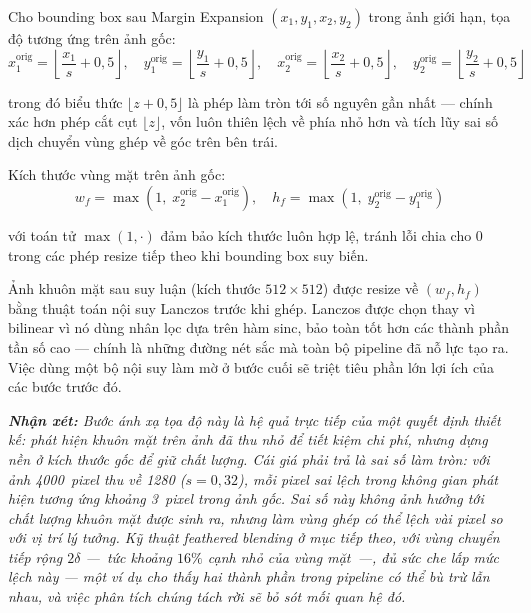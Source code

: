 Cho bounding box sau Margin Expansion $(x_1, y_1, x_2, y_2)$ trong ảnh giới hạn, tọa độ tương ứng trên ảnh gốc:
\begin{equation}
\label{eq:hybrid_map}
x_1^{\text{orig}} = \left\lfloor \frac{x_1}{s} + 0{,}5 \right\rfloor, \quad
y_1^{\text{orig}} = \left\lfloor \frac{y_1}{s} + 0{,}5 \right\rfloor, \quad
x_2^{\text{orig}} = \left\lfloor \frac{x_2}{s} + 0{,}5 \right\rfloor, \quad
y_2^{\text{orig}} = \left\lfloor \frac{y_2}{s} + 0{,}5 \right\rfloor
\end{equation}

\noindent trong đó biểu thức $\lfloor z + 0{,}5 \rfloor$ là phép làm tròn tới số nguyên gần nhất --- chính xác hơn phép cắt cụt $\lfloor z \rfloor$, vốn luôn thiên lệch về phía nhỏ hơn và tích lũy sai số dịch chuyển vùng ghép về góc trên bên trái.

Kích thước vùng mặt trên ảnh gốc:
\begin{equation}
\label{eq:hybrid_face_size}
w_f = \max(1,\; x_2^{\text{orig}} - x_1^{\text{orig}}), \quad
h_f = \max(1,\; y_2^{\text{orig}} - y_1^{\text{orig}})
\end{equation}

\noindent với toán tử $\max(1, \cdot)$ đảm bảo kích thước luôn hợp lệ, tránh lỗi chia cho 0 trong các phép resize tiếp theo khi bounding box suy biến.

Ảnh khuôn mặt sau suy luận (kích thước $512 \times 512$) được resize về $(w_f, h_f)$ bằng thuật toán nội suy Lanczos trước khi ghép. Lanczos được chọn thay vì bilinear vì nó dùng nhân lọc dựa trên hàm sinc, bảo toàn tốt hơn các thành phần tần số cao --- chính là những đường nét sắc mà toàn bộ pipeline đã nỗ lực tạo ra. Việc dùng một bộ nội suy làm mờ ở bước cuối sẽ triệt tiêu phần lớn lợi ích của các bước trước đó.

\medskip
\noindent\textit{\textbf{Nhận xét:} Bước ánh xạ tọa độ này là hệ quả trực tiếp của một quyết định thiết kế: phát hiện khuôn mặt trên ảnh đã thu nhỏ để tiết kiệm chi phí, nhưng dựng nền ở kích thước gốc để giữ chất lượng. Cái giá phải trả là sai số làm tròn: với ảnh 4000~pixel thu về 1280 ($s = 0{,}32$), mỗi pixel sai lệch trong không gian phát hiện tương ứng khoảng 3~pixel trong ảnh gốc. Sai số này không ảnh hưởng tới chất lượng khuôn mặt được sinh ra, nhưng làm vùng ghép có thể lệch vài pixel so với vị trí lý tưởng. Kỹ thuật feathered blending ở mục tiếp theo, với vùng chuyển tiếp rộng $2\delta$ ---~tức khoảng $16\%$ cạnh nhỏ của vùng mặt~---, đủ sức che lấp mức lệch này --- một ví dụ cho thấy hai thành phần trong pipeline có thể bù trừ lẫn nhau, và việc phân tích chúng tách rời sẽ bỏ sót mối quan hệ đó.}

